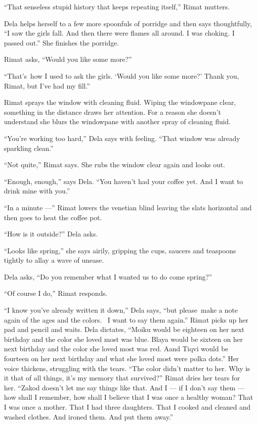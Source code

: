 \documentclass[twoside,11pt]{book}
\begin{document}
``That senseless stupid history that keeps repeating itself,'' Rimat mutters.

Dela helps herself to a few more spoonfuls of porridge and then says thoughtfully, ``I saw the girls fall.
And then there were flames all around. I was choking. I passed out.'' She finishes the porridge.

Rimat asks, ``Would you like some more?''

``That's~how I used to ask the girls. `Would you like some more?' Thank you, Rimat, but I've had my
fill.''

Rimat sprays the window with cleaning fluid. Wiping the windowpane clear, something{ }in the distance
draws her attention. For a reason she doesn't understand she blurs the windowpane with another spray of cleaning fluid.


``You're working too hard,'' Dela says with feeling. ``That window was already
sparkling clean.''

``Not quite,'' Rimat says. She rubs the window clear again and looks out.

``Enough, enough,'' says Dela. ``You haven't had your coffee yet.
And{ }I want to drink mine with you.''

``In a minute ---'' Rimat lowers the venetian blind leaving the slats horizontal and then goes
to heat the coffee pot.

``How is it outside?'' Dela asks.

``Looks like spring,'' she says airily, gripping the cups, saucers and teaspoons tightly to
allay a wave of unease.

Dela asks, ``Do you remember what I wanted us to do come spring?''

``Of course I do,'' Rimat responds.

``I know you've already written it down,'' Dela says, ``but please~make a note again of the ages and the
colors. ~I want to say them again.'' Rimat picks up her pad and pencil and waits. Dela dictates,
``Moiku would be eighteen on her next birthday and the color she loved most was blue. Blaya would be
sixteen on her next birthday and the color she loved most was red. Aand Tiqvi would be fourteen on her next birthday
and what she loved most were polka dots.'' Her voice thickens, struggling with the tears.
``The color didn't matter to her. Why is it that of all things, it's my memory that
survived?'' Rimat dries her tears for her. ``Zakod doesn't let me say things like that. And I
--- if I don't say them --- how shall I remember, how shall I believe that I was once a healthy woman? That I was once a
mother. That I had three daughters. That I cooked and cleaned and washed clothes. And ironed them. And put them
away.''
\end{document}

